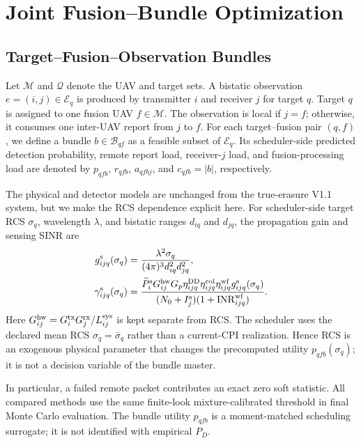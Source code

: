 \section{Joint Fusion--Bundle Optimization}\label{sec:v12-method}

\subsection{Target--Fusion--Observation Bundles}
Let $\mathcal M$ and $\mathcal Q$ denote the UAV and target sets.  A bistatic
observation $e=(i,j)\in\mathcal E_q$ is produced by transmitter $i$ and
receiver $j$ for target $q$.  Target $q$ is assigned to one fusion UAV
$f\in\mathcal M$.  The observation is local if $j=f$; otherwise, it consumes
one inter-UAV report from $j$ to $f$.  For each target--fusion pair $(q,f)$,
we define a bundle $b\in\mathcal B_{qf}$ as a feasible subset of
$\mathcal E_q$.  Its scheduler-side predicted detection probability, remote
report load, receiver-$j$ load, and fusion-processing load are denoted by
$p_{qfb}$, $r_{qfb}$, $a_{qfbj}$, and $c_{qfb}=|b|$, respectively.

The physical and detector models are unchanged from the true-erasure V1.1
system, but we make the RCS dependence explicit here.  For scheduler-side
target RCS $\sigma_q$, wavelength $\lambda$, and bistatic ranges $d_{iq}$ and
$d_{jq}$, the propagation gain and sensing SINR are
\begin{align}
g^{\rm s}_{ijq}(\sigma_q)
  &=\frac{\lambda^2\sigma_q}
  {(4\pi)^3d_{iq}^2d_{jq}^2},\\
\gamma^{\rm s}_{ijq}(\sigma_q)
  &=\frac{\widetilde P_i^{\rm s}G^{\rm hw}_{ij}G_p
  \eta^{\rm DD}_{ijq}\eta^{\rm col}_{ijq}\eta^{\rm wf}_{ijq}
  g^{\rm s}_{ijq}(\sigma_q)}
  {(N_0+I_j^{\rm s})(1+{\rm INR}^{\rm wf}_{ijq})}.
\label{eq:v12-rcs-sinr}
\end{align}
Here $G^{\rm hw}_{ij}=G_i^{\rm tx}G_j^{\rm rx}/L_{ij}^{\rm sys}$ is kept
separate from RCS.  The scheduler uses the declared mean RCS
$\sigma_q=\bar\sigma_q$ rather than a current-CPI realization.  Hence RCS is
an exogenous physical parameter that changes the precomputed utility
$p_{qfb}(\sigma_q)$; it is not a decision variable of the bundle master.

In particular, a failed remote packet contributes an exact zero soft
statistic.  All compared methods use the same finite-look mixture-calibrated
threshold in final Monte Carlo evaluation.  The bundle utility $p_{qfb}$ is a
moment-matched scheduling surrogate; it is not identified with empirical
$P_D$.

